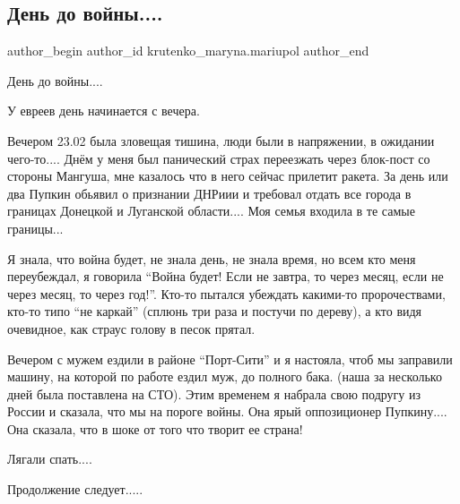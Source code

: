  
 
 
 
 

\subsection{День до войны.... }
\label{sec:23_02_2023.fb.krutenko_maryna.mariupol.1.den_do_vojny}

\ifcmt
 author_begin
   author_id krutenko_maryna.mariupol
 author_end
\fi

День до войны.... 

У евреев день начинается с вечера. 

Вечером 23.02 была зловещая тишина, люди были в напряжении, в ожидании
чего-то.... Днём у меня был панический страх переезжать через блок-пост со
стороны Мангуша, мне казалось что в него сейчас прилетит ракета.  За день или
два Пупкин обьявил о признании ДНРиии и требовал отдать все города в границах
Донецкой и Луганской области.... Моя семья входила в те самые границы... 

Я знала, что война будет, не знала день, не знала время, но всем кто меня
переубеждал, я говорила \enquote{Война будет! Если не завтра, то через месяц, если не
через месяц, то через год!}. Кто-то пытался убеждать какими-то пророчествами,
кто-то типо \enquote{не каркай} (сплюнь три раза и постучи по дереву), а кто видя
очевидное, как страус голову в песок прятал.

Вечером с мужем ездили в районе \enquote{Порт-Сити} и я настояла, чтоб мы заправили
машину, на которой по работе ездил муж,  до полного бака. (наша за несколько
дней была поставлена на СТО). Этим временем я набрала свою подругу из России и
сказала, что мы на пороге войны. Она ярый оппозиционер Пупкину.... Она сказала,
что в шоке от того что творит ее страна! 

Лягали спать....

Продолжение следует.....
